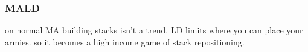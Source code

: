 \subsubsection{MALD}

on normal MA building stacks isn't a trend. LD limits where you can place your armies. so it becomes a high income game of stack repositioning.